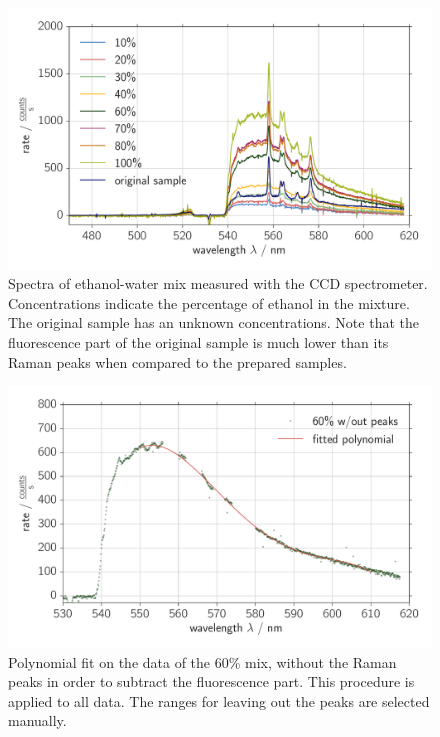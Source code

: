 \begin{figure}[htpb]
    \centering
    \includegraphics[width=0.8\linewidth]{analysis/figures/ccd_ethanol_spectra}
    \caption{
        Spectra of ethanol-water mix measured with the CCD spectrometer. Concentrations 
        indicate the percentage of ethanol in the mixture. The original sample has an unknown
        concentrations. Note that the fluorescence part of the original sample is much 
        lower than its Raman peaks when compared to the prepared samples. 
        }
    \label{fig:ccd_ethanol_spectra}
\end{figure}

\begin{figure}[htpb]
    \centering
    \includegraphics[width=0.8\linewidth]{analysis/figures/ccd_ethanol_fluorescence}
    \caption{
        Polynomial fit on the data of the 60\% mix, without the Raman peaks in order to subtract 
        the fluorescence part. This procedure is applied to all data. The ranges for leaving out 
        the peaks are selected manually.
        }
    \label{fig:ccd_ethanol_fluorescence}
\end{figure}

